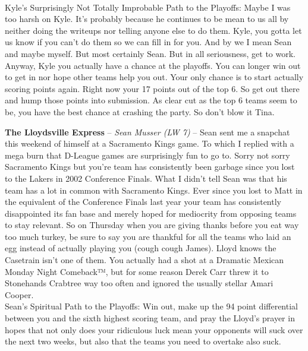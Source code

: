 \documentclass[11pt,letterpaper]{article}
\begin{document}
\begin{etaremune}
\medskip\\ Kyle's Surprisingly Not Totally Improbable Path to the Playoffs: Maybe I was too harsh on Kyle. It's probably because he continues to be mean to us all by neither doing the writeups nor telling anyone else to do them. Kyle, you gotta let us know if you can't do them so we can fill in for you. And by we I mean Sean and maybe myself. But most certainly Sean. But in all seriousness, get to work. 
Anyway, Kyle you actually have a chance at the playoffs. You can longer win out to get in nor hope other teams help you out. Your only chance is to start actually scoring points again. Right now your 17 points out of the top 6. So get out there and hump those points into submission. As clear cut as the top 6 teams seem to be, you have the best chance at crashing the party. So don't blow it Tina.
\setcounter{enumi}{8}
\item \textbf{The Lloydsville Express} -- \textit{Sean Musser (LW 7)} -- Sean sent me a snapchat this weekend of himself at a Sacramento Kings game. To which I replied with a mega burn that D-League games are surprisingly fun to go to. Sorry not sorry Sacramento Kings but you're team has consistently been garbage since you lost to the Lakers in 2002 Conference Finals. What I didn't tell Sean was that his team has a lot in common with Sacramento Kings. Ever since you lost to Matt in the equivalent of the Conference Finals last year your team has consistently disappointed its fan base and merely hoped for mediocrity from opposing teams to stay relevant. So on Thursday when you are giving thanks before you eat way too much turkey, be sure to say you are thankful for all the teams who laid an egg instead of actually playing you (cough cough James). Lloyd knows the Casetrain isn't one of them. You actually had a shot at a Dramatic Mexican Monday Night Comeback™, but for some reason Derek Carr threw it to Stonehands Crabtree way too often and ignored the usually stellar Amari Cooper. 
\medskip\\ Sean's Spiritual Path to the Playoffs: Win out, make up the 94 point differential between you and the sixth highest scoring team, and pray the Lloyd's prayer in hopes that not only does your ridiculous luck mean your opponents will suck over the next two weeks, but also that the teams you need to overtake also suck. 

\end{etaremune}
\end{document}
